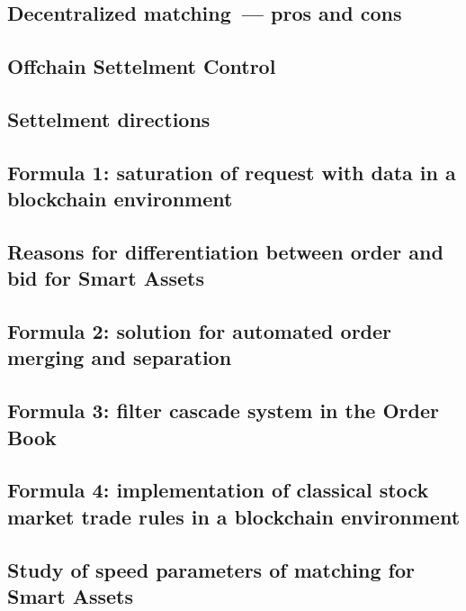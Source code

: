 \documentclass{article}
\begin{document}
\begin{multicols}{2}
\text{ }

\subsection{Decentralized matching~--- pros and cons}

\text{ }

\subsection{Offchain Settelment Control}

\text{ }

\subsection{Settelment directions}

\text{ }

\subsection{Formula 1: saturation of request with data in a blockchain environment}

\text{ }

\subsection{Reasons for differentiation between order and bid for Smart Assets}

\text{ }

\subsection{Formula 2: solution for automated order merging and separation}

\text{ }

\subsection{Formula 3: filter cascade system in the Order Book}

\text{ }

\subsection{Formula 4: implementation of classical stock market trade rules in a blockchain environment}

\text{ }

\subsection{Study of speed parameters of matching for Smart Assets}


\end{multicols}
\end{document}
